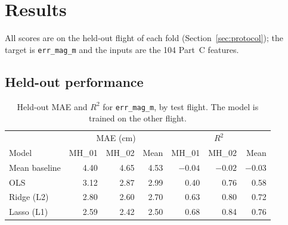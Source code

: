 %

\section{Results}
\label{sec:results}

All scores are on the held-out flight of each fold
(Section~\ref{sec:protocol}); the target is \texttt{err\_mag\_m} and the inputs
are the 104 Part~C features.

\subsection{Held-out performance}
\label{sec:results-heldout}

\begin{table}[htbp]
\centering
\caption{Held-out MAE and $R^2$ for \texttt{err\_mag\_m}, by test flight.
The model is trained on the other flight.}
\label{tab:heldout}
\begin{tabular}{lrrrrrr}
\hline
 & \multicolumn{3}{c}{MAE (cm)} & \multicolumn{3}{c}{$R^2$} \\
Model & MH\_01 & MH\_02 & Mean & MH\_01 & MH\_02 & Mean \\
\hline
Mean baseline & 4.40 & 4.65 & 4.53 & $-0.04$ & $-0.02$ & $-0.03$ \\
OLS           & 3.12 & 2.87 & 2.99 & 0.40 & 0.76 & 0.58 \\
Ridge (L2)    & 2.80 & 2.60 & 2.70 & 0.63 & 0.80 & 0.72 \\
Lasso (L1)    & 2.59 & 2.42 & 2.50 & 0.68 & 0.84 & 0.76 \\
\hline
\end{tabular}
\end{table}

